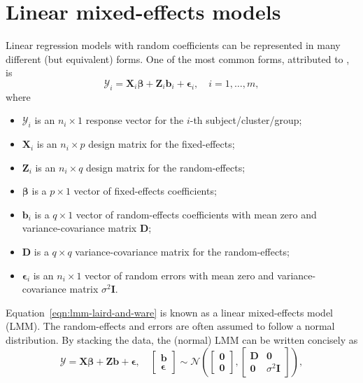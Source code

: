 \documentclass{article}\usepackage[]{graphicx}\usepackage[]{color}
\begin{document}
\section{Linear mixed-effects models}
\label{sec:lmm}

Linear regression models with random coefficients can be represented in many different (but equivalent) forms.  One of the most common forms, attributed to \citet{laird-random-1982}, is
\begin{equation}
\label{eqn:lmm-laird-and-ware}
  \bm{\mathcal{Y}}_i = \bm{X}_i\bm{\beta} + \bm{Z}_i\bm{b}_i + \bm{\epsilon}_i, \quad i = 1, \dotsc, m,
\end{equation}
where
\begin{itemize}
  \item $\bm{\mathcal{Y}}_i$ is an $n_i \times 1$ response vector for the $i$-th subject/cluster/group;
  \item $\bm{X}_i$ is an $n_i \times p$ design matrix for the fixed-effects;
  \item $\bm{Z}_i$ is an $n_i \times q$ design matrix for the random-effects;
  \item $\bm{\beta}$ is a $p \times 1$ vector of fixed-effects coefficients;
  \item $\bm{b}_i$ is a $q \times 1$ vector of random-effects coefficients with mean zero and variance-covariance matrix $\bm{D}$;
  \item $\bm{D}$ is a $q \times q$ variance-covariance matrix for the random-effects;
  \item $\bm{\epsilon}_i$ is an $n_i \times 1$ vector of random errors with mean zero and variance-covariance matrix $\sigma^2\bm{I}$.
\end{itemize}
Equation~\eqref{eqn:lmm-laird-and-ware} is known as a linear mixed-effects model (LMM).  The random-effects and errors are often assumed to follow a normal distribution.  By stacking the data, the (normal) LMM can be written concisely as
\begin{equation}
\label{eqn:lmm-stacked}
    \bm{\mathcal{Y}} = \bm{X}\bm{\beta} + \bm{Z}\bm{b} + \bm{\epsilon}, \quad
      \begin{bmatrix}
        \bm{b} \\
        \bm{\epsilon}
      \end{bmatrix} \sim
      \mathcal{N}\left(\begin{bmatrix}
        \bm{0} \\
        \bm{0}
      \end{bmatrix}, \begin{bmatrix}
        \bm{D} & \bm{0} \\
        \bm{0} & \sigma^2\bm{I}
      \end{bmatrix}\right),
\end{equation}
\end{document}
